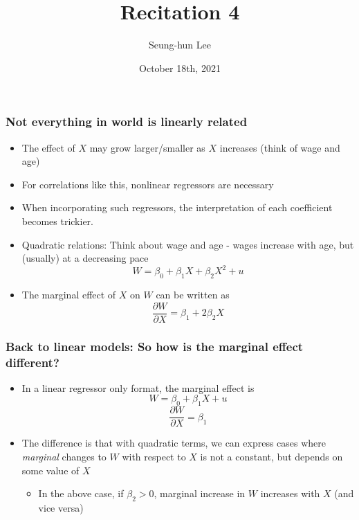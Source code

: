\documentclass[aspectratio=169]{beamer}
\title[Recitation 4]{Recitation 4} %
\author[Seung-hun Lee]{Seung-hun Lee}
\institute[Columbia University]{Columbia University}
\date[October 18th, 2021]{October 18th, 2021}
\begin{document}
\begin{frame}
\titlepage
\end{frame}


\begin{frame}
\frametitle{Not everything in world is linearly related}
\begin{itemize}
\item The effect of $X$ may grow larger/smaller as $X$ increases (think of wage and age)
 \item For correlations like this, nonlinear regressors are necessary
 \item When incorporating such regressors, the interpretation of each coefficient becomes trickier.
 \item Quadratic relations: Think about wage and age - wages increase with age, but (usually) at a decreasing pace
 \[
W = \beta_0 + \beta_1 X+ \beta_2 X^2+u
\]
\item The marginal effect of $X$ on $W$ can be written as
\[
\frac{\partial W}{\partial X}=\beta_1+2\beta_2 X
\]
\end{itemize}
\end{frame}

\begin{frame}
\frametitle{Back to linear models: So how is the marginal effect different?}
\begin{itemize}
 \item In a linear regressor only format, the marginal effect is
 \[
W = \beta_0 + \beta_1 X+u
\]
\[
\frac{\partial W}{\partial X}=\beta_1
\]
\item The difference is that with quadratic terms, we can express cases where \textit{marginal} changes to $W$ with respect to $X$ is not a constant, but depends on some value of $X$
\begin{itemize}
\item In the above case, if $\beta_2>0$, marginal increase in $W$ increases with $X$ (and vice versa)
\end{itemize}
\end{itemize}
\end{frame}
\end{document}
